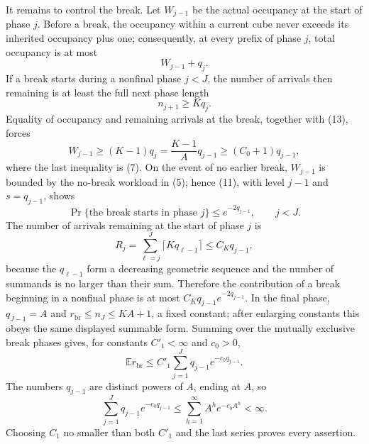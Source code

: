 It remains to control the break.  Let \(W_{j-1}\) be the actual occupancy at the start of phase \(j\).  Before a break, the occupancy within a current cube never exceeds its inherited occupancy plus one; consequently, at every prefix of phase \(j\), total occupancy is at most
\[
 W_{j-1}+q_j. \tag{13}
\]
If a break starts during a nonfinal phase \(j<J\), the number of arrivals then remaining is at least the full next phase length
\[
 n_{j+1}\ge Kq_j.
\]
Equality of occupancy and remaining arrivals at the break, together with (13), forces
\[
 W_{j-1}\ge(K-1)q_j=\frac{K-1}{A}q_{j-1}\ge(C_0+1)q_{j-1}, \tag{14}
\]
where the last inequality is (7).  On the event of no earlier break, \(W_{j-1}\) is bounded by the no-break workload in (5); hence (11), with level \(j-1\) and \(s=q_{j-1}\), shows
\[
 \Pr\{\text{the break starts in phase }j\}\le e^{-2q_{j-1}},
 \qquad j<J. \tag{15}
\]
The number of arrivals remaining at the start of phase \(j\) is
\[
 R_j=\sum_{\ell=j}^J\lceil Kq_{\ell-1}\rceil
 \le C_Kq_{j-1}, \tag{16}
\]
because the \(q_{\ell-1}\) form a decreasing geometric sequence and the number of summands is no larger than their sum.  Therefore the contribution of a break beginning in a nonfinal phase is at most \(C_Kq_{j-1}e^{-2q_{j-1}}\).  In the final phase, \(q_{J-1}=A\) and \(r_{\mathrm{br}}\le n_J\le KA+1\), a fixed constant; after enlarging constants this obeys the same displayed summable form.  Summing over the mutually exclusive break phases gives, for constants \(C'_1<\infty\) and \(c_0>0\),
\[
 \mathbb E r_{\mathrm{br}}
 \le C'_1\sum_{j=1}^Jq_{j-1}e^{-c_0q_{j-1}}.
\]
The numbers \(q_{j-1}\) are distinct powers of \(A\), ending at \(A\), so
\[
 \sum_{j=1}^Jq_{j-1}e^{-c_0q_{j-1}}
 \le \sum_{h=1}^{\infty}A^he^{-c_0A^h}<\infty.
\]
Choosing \(C_1\) no smaller than both \(C'_1\) and the last series proves every assertion.
